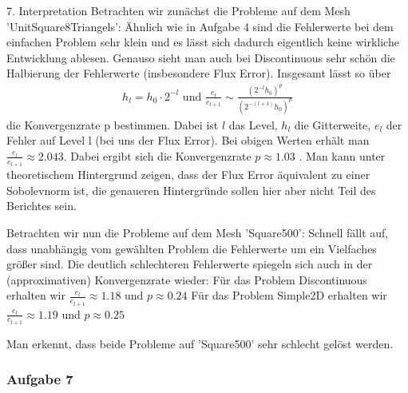 \documentclass[12pt,a4paper]{scrartcl}
\numberwithin{equation}{section}
\begin{document}
\begin{enumerate}[label=(\roman*)]
7. Interpretation \newline
Betrachten wir zunächst die Probleme auf dem Mesh 'UnitSquare8Triangels': \newline
Ähnlich wie in Aufgabe 4 sind die Fehlerwerte bei dem einfachen Problem sehr klein und es lässt sich dadurch eigentlich keine wirkliche Entwicklung ablesen. Genauso sieht man auch bei Discontinuous sehr schön die Halbierung der Fehlerwerte (insbesondere Flux Error). Insgesamt lässt so über 
\begin{align*}
h_l = h_0 \cdot 2^{-l} \text{ und } \frac{e_l}{e_{l+1}} \sim \frac{(2^{-l}h_0)^{p}}{(2^{-(l+1)}h_0)^{p}} %
\end{align*}
die Konvergenzrate p bestimmen. Dabei ist $l$ das Level, $h_l$ die Gitterweite, $e_l$ der Fehler auf Level l (bei uns der Flux Error). 
Bei obigen Werten erhält man $ \frac{e_l}{e_{l+1}} \approx 2.043 $. \newline
Dabei ergibt sich die Konvergenzrate $p \approx 1.03$ .
Man kann unter theoretischem Hintergrund zeigen, dass der Flux Error äquivalent zu einer Sobolevnorm ist, die genaueren Hintergründe sollen hier aber nicht Teil des Berichtes sein.

Betrachten wir nun die Probleme auf dem Mesh 'Square500': Schnell fällt auf, dass unabhängig vom gewählten Problem die Fehlerwerte um ein Vielfaches größer sind. Die deutlich schlechteren Fehlerwerte spiegeln sich auch in der (approximativen) Konvergenzrate wieder: \newline
Für das Problem Discontinuous erhalten wir $ \frac{e_l}{e_{l+1}} \approx 1.18 $ und $p \approx 0.24$ \newline
Für das Problem Simple2D erhalten wir $ \frac{e_l}{e_{l+1}} \approx 1.19 $ und $p \approx 0.25$ \newline

Man erkennt, dass beide Probleme auf 'Square500' sehr schlecht gelöst werden.

\subsubsection{Aufgabe 7}


\end{enumerate}
\end{document}
